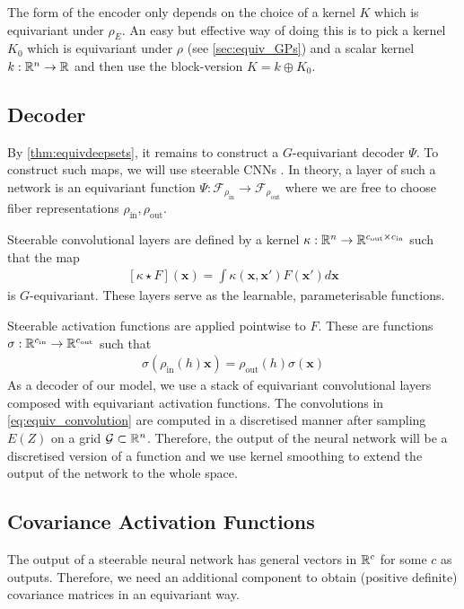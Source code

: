 The form of the encoder only depends on the choice of a kernel $K$ which is equivariant under $\rho_E$.
An easy but effective way of doing this is to pick a kernel $K_0$ which is equivariant under $\rho$ (see \cref{sec:equiv_GPs}) and a scalar kernel $k:\mathbb{R}^n\to\mathbb{R}$ and then use the block-version $K=k\oplus K_0$.

\subsection{Decoder}
\label{sec:decoder}
By \cref{thm:equivdeepsets}, it remains to construct a $G$-equivariant decoder $\Psi$.
To construct such maps, we will use steerable CNNs \parencite{SteerCNNs,E2Steerable,3DSteerable}.
In theory, a layer of such a network is an equivariant function $\Psi:\mathcal{F}_{\rho_\text{in}}\to\mathcal{F}_{\rho_\text{out}}$ where we are free to choose fiber representations $\rho_\text{in},\rho_\text{out}$.

Steerable convolutional layers are defined by a kernel $\kappa:\mathbb{R}^n\to\mathbb{R}^{c_\text{out}\times c_\text{in}}$ such that the map \begin{align} \label{eq:equiv_convolution} [\kappa\star F](\mathbf{x})=\int\kappa(\mathbf{x}, \mathbf{x}')F(\mathbf{x}')d\mathbf{x} \end{align} is $G$-equivariant.
These layers serve as the learnable, parameterisable functions.

Steerable activation functions are applied pointwise to $F$.
These are functions $\sigma:\mathbb{R}^{c_\text{in}}\to\mathbb{R}^{c_\text{out}}$ such that \begin{align} \label{eq:equiv_activation_function} \sigma(\rho_{\text{in}}(h)\mathbf{x})=\rho_{\text{out}}(h)\sigma(\mathbf{x}) \end{align} As a decoder of our model, we use a stack of equivariant convolutional layers composed with equivariant activation functions.
The convolutions in \cref{eq:equiv_convolution} are computed in a discretised manner after sampling $E(Z)$ on a grid $\mathcal{G}\subset\mathbb{R}^n$.
Therefore, the output of the neural network will be a discretised version of a function and we use kernel smoothing to extend the output of the network to the whole space.

\subsection{Covariance Activation Functions}
The output of a steerable neural network has general vectors in $\mathbb{R}^c$ for some $c$ as outputs.
Therefore, we need an additional component to obtain (positive definite) covariance matrices in an equivariant way.

